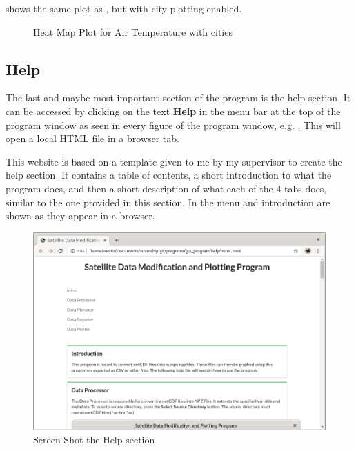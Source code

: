\documentclass[../00_main.tex]{subfiles}
\begin{document}
 shows the same plot as , but with city
plotting enabled.
\begin{figure}[h]
    \center
    \caption{Heat Map Plot for Air Temperature with cities}
    \label{plt:dpl03}
\end{figure}

\subsection{Help}

The last and maybe most important section of the program is the help section.
It can be accessed by clicking on the text \textbf{Help} in the menu bar at the
top of the program window as seen in every figure of the program window, e.g.
. This will open a local HTML file in a browser tab.\newline

This website is based on a template given to me by my supervisor to create the 
help section. It contains a table of contents, a short introduction to what the
program does, and then a short description of what each of the 4 tabs does,
similar to the one provided in this section. In  the menu and
introduction are shown as they appear in a browser.
\begin{figure}[H]
    \center
    \includegraphics[width=\textwidth]{../graphics/help}
    \vspace{-20pt}
    \caption{Screen Shot the Help section}
    \label{help}
\end{figure}
\end{document}
